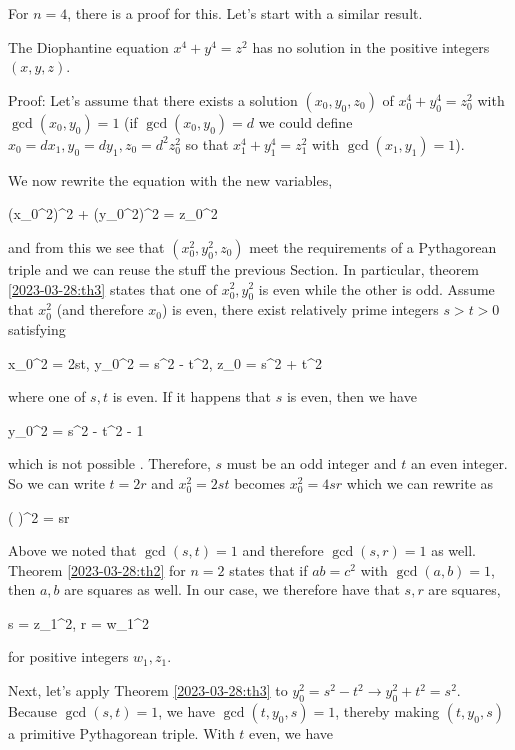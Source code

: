 For $n=4$, there is a proof for this. Let's start with a similar result.

\begin{theorem}
    The Diophantine equation $x^4 + y^4 = z^2$ has no solution in the positive integers $(x,y,z)$.
\end{theorem}

Proof: Let's assume that there exists a solution $(x_0, y_0, z_0)$ of $x_0^4 + y_0^4 = z_0^2$ with $\gcd(x_0, y_0) = 1$ (if $\gcd(x_0, y_0) = d$ we could define $x_0 = d x_1, y_0 = d y_1, z_0 = d^2 z_0^2$ so that $x_1^4 + y_1^4 = z_1^2$ with $\gcd(x_1, y_1) = 1$).

We now rewrite the equation with the new variables,

\bee
(x_0^2)^2 + (y_0^2)^2 = z_0^2
\eee

and from this we see that $(x_0^2, y_0^2, z_0)$ meet the requirements of a Pythagorean triple and we can reuse the stuff the previous Section. In particular, theorem \ref{2023-03-28:th3} states that one of $x_0^2, y_0^2$ is even while the other is odd. Assume that $x_0^2$ (and therefore $x_0$) is even, there exist relatively prime integers $s > t > 0$ satisfying

\bee
x_0^2 = 2st, \quad y_0^2 = s^2 - t^2, \quad z_0 = s^2 + t^2
\eee

where one of $s, t$ is even. If it happens that $s$ is even, then we have

 \equiv y_0^2 = s^2 - t^2  - 1  
\eee

which is not possible . Therefore, $s$ must be an odd integer and $t$ an even integer. So we can write $t = 2r$ and $x_0^2 = 2st$ becomes $x_0^2 = 4sr$ which we can rewrite as

\bee
\left(  \right)^2 = sr
\eee

Above we noted that $\gcd(s, t) = 1$ and therefore $\gcd(s, r) = 1$ as well. Theorem \ref{2023-03-28:th2} for $n=2$ states that if $ab=c^2$ with $\gcd(a,b)=1$, then $a, b$ are squares as well. In our case, we therefore have that $s, r$ are squares,

\bee
s = z_1^2, \quad r = w_1^2
\eee

for positive integers $w_1, z_1$.

Next, let's apply Theorem \ref{2023-03-28:th3} to $y_0^2 = s^2 - t^2 \rightarrow y_0^2 + t^2 = s^2$. Because $\gcd(s,t) = 1$, we have $\gcd(t, y_0, s) = 1$, thereby making $(t, y_0, s)$ a primitive Pythagorean triple. With $t$ even, we have

